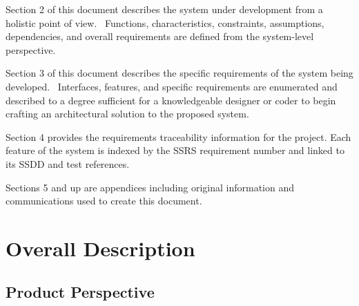 \documentclass[twoside,letterpaper]{article}
\begin{document}
Section 2 of this document describes the system under development from a
holistic point of view. \ Functions, characteristics, constraints,
assumptions, dependencies, and overall requirements are defined from
the system-level perspective.

Section 3 of this document describes the specific requirements of the
system being developed. \ Interfaces, features, and specific
requirements are enumerated and described to a degree sufficient for a
knowledgeable designer or coder to begin crafting an architectural
solution to the proposed system.

Section 4 provides the requirements traceability information for the
project.  Each feature of the system is indexed by the SSRS
requirement number and linked to its SSDD and test references.

Sections 5 and up are appendices including original information and
communications used to create this document.



\section{Overall Description}

\subsection{Product Perspective}
\end{document}
